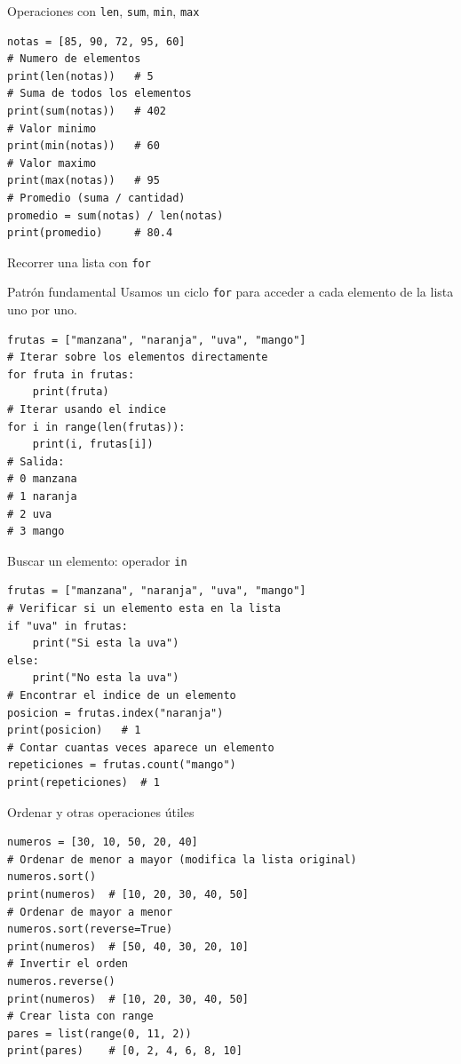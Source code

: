 \documentclass[aspectratio=169,xcolor=dvipsnames]{beamer}
\begin{document}
\begin{frame}[fragile]{Operaciones con \texttt{len}, \texttt{sum}, \texttt{min}, \texttt{max}}
\begin{lstlisting}[style=PythonStyle]
notas = [85, 90, 72, 95, 60]
# Numero de elementos
print(len(notas))   # 5
# Suma de todos los elementos
print(sum(notas))   # 402
# Valor minimo
print(min(notas))   # 60
# Valor maximo
print(max(notas))   # 95
# Promedio (suma / cantidad)
promedio = sum(notas) / len(notas)
print(promedio)     # 80.4
\end{lstlisting}
\end{frame}

\begin{frame}[fragile]{Recorrer una lista con \texttt{for}}
    \begin{block}{Patrón fundamental}
        Usamos un ciclo \texttt{for} para acceder a cada elemento de la lista uno por uno.
    \end{block}
\begin{lstlisting}[style=PythonStyle]
frutas = ["manzana", "naranja", "uva", "mango"]
# Iterar sobre los elementos directamente
for fruta in frutas:
    print(fruta)
# Iterar usando el indice
for i in range(len(frutas)):
    print(i, frutas[i])
# Salida:
# 0 manzana
# 1 naranja
# 2 uva
# 3 mango
\end{lstlisting}
\end{frame}

\begin{frame}[fragile]{Buscar un elemento: operador \texttt{in}}
\begin{lstlisting}[style=PythonStyle]
frutas = ["manzana", "naranja", "uva", "mango"]
# Verificar si un elemento esta en la lista
if "uva" in frutas:
    print("Si esta la uva")
else:
    print("No esta la uva")
# Encontrar el indice de un elemento
posicion = frutas.index("naranja")
print(posicion)   # 1
# Contar cuantas veces aparece un elemento
repeticiones = frutas.count("mango")
print(repeticiones)  # 1
\end{lstlisting}
\end{frame}

\begin{frame}[fragile]{Ordenar y otras operaciones útiles}
\begin{lstlisting}[style=PythonStyle]
numeros = [30, 10, 50, 20, 40]
# Ordenar de menor a mayor (modifica la lista original)
numeros.sort()
print(numeros)  # [10, 20, 30, 40, 50]
# Ordenar de mayor a menor
numeros.sort(reverse=True)
print(numeros)  # [50, 40, 30, 20, 10]
# Invertir el orden
numeros.reverse()
print(numeros)  # [10, 20, 30, 40, 50]
# Crear lista con range
pares = list(range(0, 11, 2))
print(pares)    # [0, 2, 4, 6, 8, 10]
\end{lstlisting}
\end{frame}
\end{document}
